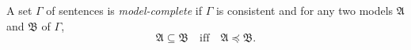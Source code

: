 A set $\Gamma$ of sentences is \textit{model-complete} if $\Gamma$ is consistent and for any two models $\mathfrak{A}$ and $\mathfrak{B}$ of $\Gamma$,
$$\mathfrak{A} \subseteq \mathfrak{B} \quad \text{iff} \quad \mathfrak{A} \preceq \mathfrak{B}.$$
